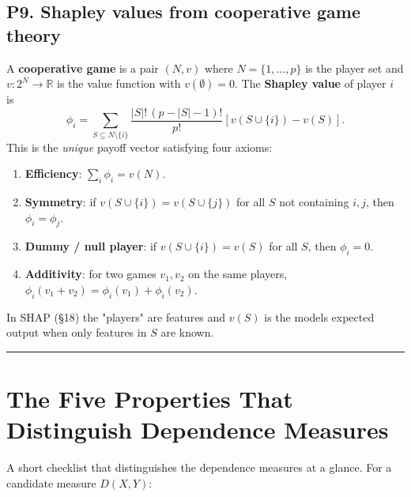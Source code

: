 \documentclass{article}
\providecommand{\tightlist}{\setlength{\itemsep}{0pt}\setlength{\parskip}{0pt}}
\let\oldsection\section
\renewcommand{\section}{\clearpage\oldsection}
\begin{document}
\subsection{P9. Shapley values from cooperative game
theory}\label{p9-shapley-values-from-cooperative-game-theory}

A \textbf{cooperative game} is a pair \((N, v)\) where
\(N = \{1, \dots, p\}\) is the player set and \(v: 2^N \to \mathbb{R}\)
is the value function with \(v(\emptyset) = 0\). The \textbf{Shapley
value} of player \(i\) is \[
\phi_i = \sum_{S \subseteq N \setminus \{i\}} \frac{|S|!\,(p - |S| - 1)!}{p!} \left[ v(S \cup \{i\}) - v(S) \right].
\] This is the \emph{unique} payoff vector satisfying four axioms:

\begin{enumerate}
\def\labelenumi{\arabic{enumi}.}
\tightlist
\item
  \textbf{Efficiency}: \(\sum_i \phi_i = v(N)\).
\item
  \textbf{Symmetry}: if \(v(S \cup \{i\}) = v(S \cup \{j\})\) for all
  \(S\) not containing \(i, j\), then \(\phi_i = \phi_j\).
\item
  \textbf{Dummy / null player}: if \(v(S \cup \{i\}) = v(S)\) for all
  \(S\), then \(\phi_i = 0\).
\item
  \textbf{Additivity}: for two games \(v_1, v_2\) on the same players,
  \(\phi_i(v_1 + v_2) = \phi_i(v_1) + \phi_i(v_2)\).
\end{enumerate}

In SHAP (§18) the "players" are features and \(v(S)\) is the
model\textquotesingle s expected output when only features in \(S\) are
known.

\begin{center}\rule{0.5\linewidth}{0.5pt}\end{center}

\section{The Five Properties That Distinguish Dependence
Measures}\label{the-five-properties-that-distinguish-dependence-measures}

A short checklist that distinguishes the dependence measures at a
glance. For a candidate measure \(D(X, Y)\):
\end{document}
